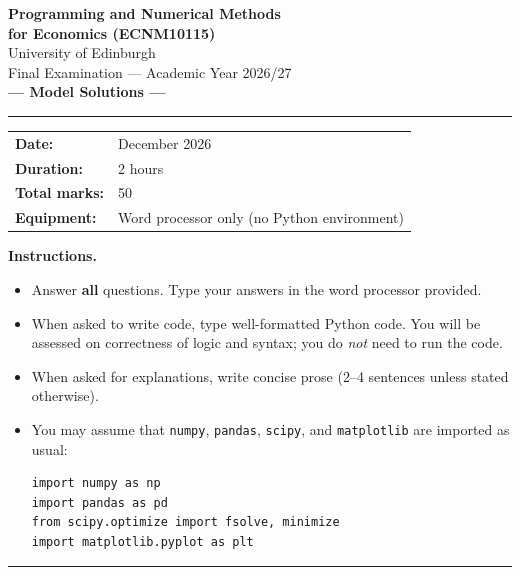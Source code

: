 \documentclass[11pt,a4paper]{article}
\begin{document}

\begin{center}
{\LARGE\bfseries Programming and Numerical Methods\\[2pt] for Economics (ECNM10115)}\\[10pt]
{\large University of Edinburgh}\\[4pt]
{\large Final Examination --- Academic Year 2026/27}\\[6pt]
{\large\color{blue!60!black}\bfseries --- Model Solutions ---}\\[10pt]
\rule{0.7\textwidth}{0.4pt}
\end{center}

\vspace{4pt}

\noindent
\begin{tabular}{@{}ll}
\textbf{Date:}     & December 2026 \\
\textbf{Duration:} & 2 hours \\
\textbf{Total marks:} & 50 \\
\textbf{Equipment:} & Word processor only (no Python environment) \\
\end{tabular}

\vspace{6pt}

\noindent\textbf{Instructions.}
\begin{itemize}[nosep,leftmargin=1.4em]
\item Answer \textbf{all} questions.  Type your answers in the word processor provided.
\item When asked to write code, type well-formatted Python code.  You will be assessed on correctness of logic and syntax; you do \emph{not} need to run the code.
\item When asked for explanations, write concise prose (2--4 sentences unless stated otherwise).
\item You may assume that \texttt{numpy}, \texttt{pandas}, \texttt{scipy}, and \texttt{matplotlib} are imported as usual:
\begin{lstlisting}[numbers=none]
import numpy as np
import pandas as pd
from scipy.optimize import fsolve, minimize
import matplotlib.pyplot as plt
\end{lstlisting}
\end{itemize}

\vspace{6pt}
\hrule
\vspace{12pt}
\end{document}
